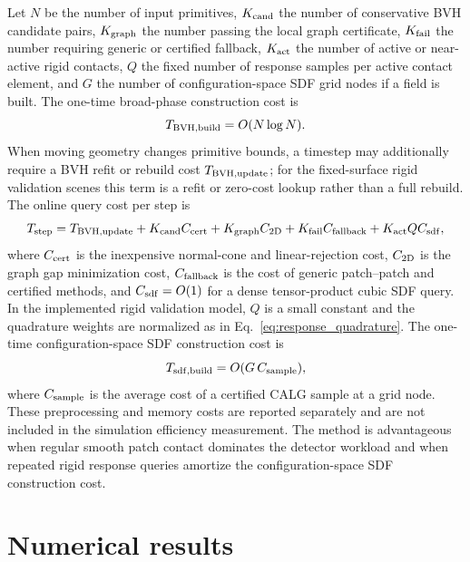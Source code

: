 \documentclass[preprint,12pt]{elsarticle}
\newcommand{\calg}{\textsc{CALG}}
\begin{document}
Let $N$ be the number of input primitives, $K_{\rm cand}$ the number of conservative BVH candidate pairs, $K_{\rm graph}$ the number passing the local graph certificate, $K_{\rm fail}$ the number requiring generic or certified fallback, $K_{\rm act}$ the number of active or near-active rigid contacts, $Q$ the fixed number of response samples per active contact element, and $G$ the number of configuration-space SDF grid nodes if a field is built. The one-time broad-phase construction cost is
\begin{equation}
    T_{\rm BVH,build}=O(N\log N).
    \label{eq:bvh_build_complexity}
\end{equation}
When moving geometry changes primitive bounds, a timestep may additionally require a BVH refit or rebuild cost $T_{\rm BVH,update}$; for the fixed-surface rigid validation scenes this term is a refit or zero-cost lookup rather than a full rebuild. The online query cost per step is
\begin{equation}
    T_{\rm step} = T_{\rm BVH,update}
        + K_{\rm cand} C_{\rm cert}
        + K_{\rm graph} C_{\rm 2D}
        + K_{\rm fail} C_{\rm fallback}
        + K_{\rm act} Q C_{\rm sdf},
    \label{eq:complexity}
\end{equation}
where $C_{\rm cert}$ is the inexpensive normal-cone and linear-rejection cost, $C_{\rm 2D}$ is the graph gap minimization cost, $C_{\rm fallback}$ is the cost of generic patch--patch and certified methods, and $C_{\rm sdf}=O(1)$ for a dense tensor-product cubic SDF query. In the implemented rigid validation model, $Q$ is a small constant and the quadrature weights are normalized as in Eq.~\eqref{eq:response_quadrature}. The one-time configuration-space SDF construction cost is
\begin{equation}
    T_{\rm sdf,build}=O(G\,C_{\rm sample}),
\end{equation}
where $C_{\rm sample}$ is the average cost of a certified \calg{} sample at a grid node. These preprocessing and memory costs are reported separately and are not included in the simulation efficiency measurement. The method is advantageous when regular smooth patch contact dominates the detector workload and when repeated rigid response queries amortize the configuration-space SDF construction cost.

\section{Numerical results}
\label{sec:results}
\end{document}
